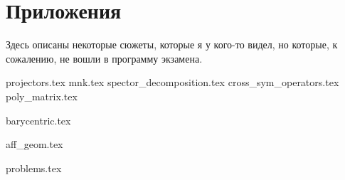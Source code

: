 \documentclass[a4paper, 11pt]{article}
\begin{document}
\newpage

\setcounter{problem}{0}

\section{Приложения}

Здесь описаны некоторые сюжеты, которые я у кого-то видел, но которые, к сожалению, не вошли в программу экзамена.

{projectors.tex}
{mnk.tex}
{spector_decomposition.tex}
{cross_sym_operators.tex}
{poly_matrix.tex}

\renewcommand{\A}{\mathfrak{A}}
\renewcommand{\B}{\mathfrak{B}}

{barycentric.tex}

\renewcommand{\A}{\mathcal{A}}
\renewcommand{\B}{\mathcal{B}}

{aff_geom.tex}

\newpage

\setcounter{problem}{0}

{problems.tex}
\end{document}
